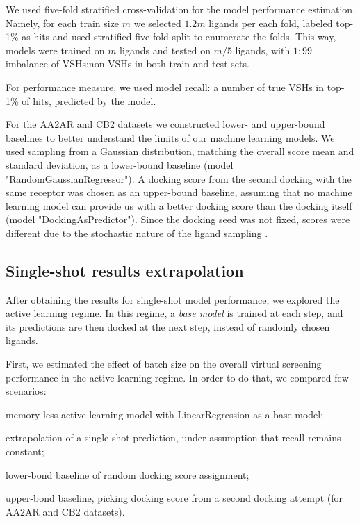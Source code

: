 We used five-fold stratified cross-validation for the model performance estimation. Namely, for each train size $m$ we selected $1.2m$ ligands per each fold, labeled top-1\% as hits and used stratified five-fold split to enumerate the folds. This way, models were trained on $m$ ligands and tested on $m/5$ ligands, with $1:99$ imbalance of VSHs:non-VSHs in both train and test sets.

For performance measure, we used model recall: a number of true VSHs in top-1\% of hits, predicted by the model.

For the AA2AR and CB2 datasets we constructed lower- and upper-bound baselines to better understand the limits of our machine learning models. We used sampling from a Gaussian distribution, matching the overall score mean and standard deviation, as a lower-bound baseline (model "RandomGaussianRegressor"). A docking score from the second docking with the same receptor was chosen as an upper-bound baseline, assuming that no machine learning model can provide us with a better docking score than the docking itself (model "DockingAsPredictor"). Since the docking seed was not fixed, scores were different due to the stochastic nature of the ligand sampling \cite{abagyan_biased_1994}.

\subsection{Single-shot results extrapolation}

After obtaining the results for single-shot model performance, we explored the active learning regime. In this regime, a \textit{base model} is trained at each step, and its predictions are then docked at the next step, instead of randomly chosen ligands. 

First, we estimated the effect of batch size on the overall virtual screening performance in the active learning regime. In order to do that, we compared few scenarios: 
\begin{enumerate*}[label=(\roman*)]
    \item memory-less active learning model with LinearRegression as a base model;
    \item extrapolation of a single-shot prediction, under assumption that recall remains constant;
    \item lower-bond baseline of random docking score assignment;
    \item upper-bond baseline, picking docking score from a second docking attempt (for AA2AR and CB2 datasets).
\end{enumerate*}

